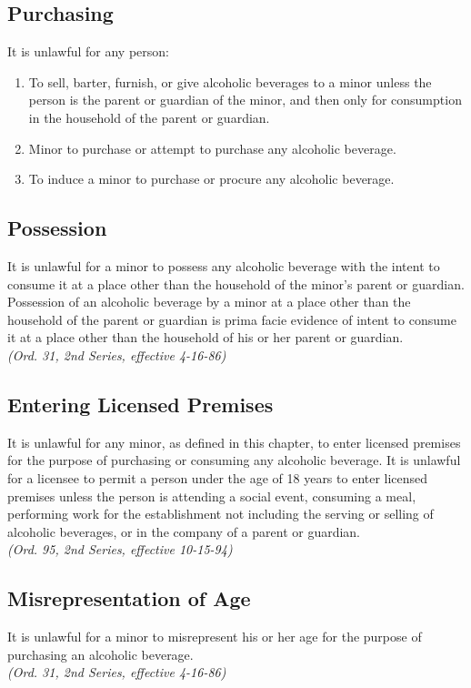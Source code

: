 \subsection{Purchasing}
It is unlawful for any person:
\begin{enumerate}[{\indent}1)]
    \item To sell, barter, furnish, or give alcoholic beverages to a minor unless the person is the parent or guardian of the minor, and then only for consumption in the household of the parent or guardian.
    \item Minor to purchase or attempt to purchase any alcoholic beverage.
    \item To induce a minor to purchase or procure any alcoholic beverage.
\end{enumerate}
\subsection{Possession}
It is unlawful for a minor to possess any alcoholic beverage with the intent to consume it at a place other than the household of the minor’s parent or guardian.  Possession of an alcoholic beverage by a minor at a place other than the household of the parent or guardian is prima facie evidence of intent to consume it at a place other than the household of his or her parent or guardian.\\
\emph{(Ord. 31, 2nd Series, effective 4-16-86)}
\subsection{Entering Licensed Premises}
It is unlawful for any minor, as defined in this chapter, to enter licensed premises for the purpose of purchasing or consuming any alcoholic beverage.  It is unlawful for a licensee to permit a person under the age of 18 years to enter licensed premises unless the person is attending a social event, consuming a meal, performing work for the establishment not including the serving or selling of alcoholic beverages, or in the company of a parent or guardian.\\
\emph{(Ord. 95, 2nd Series, effective 10-15-94)}
\subsection{Misrepresentation of Age}
It is unlawful for a minor to misrepresent his or her age for the purpose of purchasing an alcoholic beverage.\\
\emph{(Ord. 31, 2nd Series, effective 4-16-86)}
